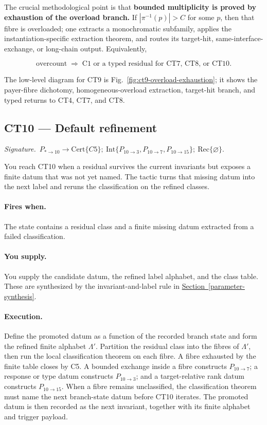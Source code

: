 \documentclass[
  11pt,
]{article}
\theoremstyle{definition}
\newcommand{\secref}[1]{\hyperref[#1]{Section~\ref*{#1}}}
\newcommand{\ctsignature}[1]{\par\noindent\emph{Signature.}\ #1\par\medskip}
\newcommand{\ctcert}[1]{\mathrm{Cert}\{#1\}}
\newcommand{\ctint}[1]{\mathrm{Int}\{#1\}}
\newcommand{\ctrec}[1]{\mathrm{Rec}\{#1\}}
\newcommand{\ctnone}{\varnothing}
\newcommand{\ctpar}[1]{\paragraph{#1.}}
\begin{document}
The crucial methodological point is that \textbf{bounded multiplicity is
proved by exhaustion of the overload branch.} If \(|\pi^{-1}(p)| > C\)
for some \(p\), then that fibre is overloaded; one extracts a
monochromatic subfamily, applies the instantiation-specific extraction
theorem, and routes its target-hit, same-interface-exchange, or long-chain
output. Equivalently,

\[
\text{overcount} \;\Rightarrow\;
\text{C1 or a typed residual for CT7, CT8, or CT10}.
\]

The low-level diagram for CT9 is Fig.~\ref{fig:ct9-overload-exhaustion};
it shows the payer-fibre dichotomy, homogeneous-overload extraction,
target-hit branch, and typed returns to CT4, CT7, and CT8.


\subsection{CT10 --- Default refinement}\label{ct:10}\label{the-default-refinement}
\ctsignature{\(P_{\ast\to10}\to \ctcert{C5};\ \ctint{P_{10\to3},P_{10\to7},P_{10\to15}};\ \ctrec{\ctnone}\).}

You reach CT10 when a residual survives the current invariants but
exposes a finite datum that was not yet named.  The tactic turns that
missing datum into the next label and reruns the classification on the
refined classes.

\ctpar{Fires when}
The state contains a residual class and a finite missing datum extracted
from a failed classification.

\ctpar{You supply}
You supply the candidate datum, the refined label alphabet, and the class
table.  These are synthesized by the invariant-and-label rule in
\secref{parameter-synthesis}.

\ctpar{Execution}
Define the promoted datum as a function of the recorded branch state and
form the refined finite alphabet \(\Lambda'\).  Partition the residual
class into the fibres of \(\Lambda'\), then run the local classification
theorem on each fibre.  A fibre exhausted by the finite table closes by
C5.  A bounded exchange inside a fibre constructs \(P_{10\to7}\); a
response or type datum constructs \(P_{10\to3}\); and a target-relative
rank datum constructs \(P_{10\to15}\).  When a fibre remains
unclassified, the classification theorem must name the next branch-state
datum before CT10 iterates.  The promoted datum is then recorded as the
next invariant, together with its finite alphabet and trigger payload.
\end{document}
